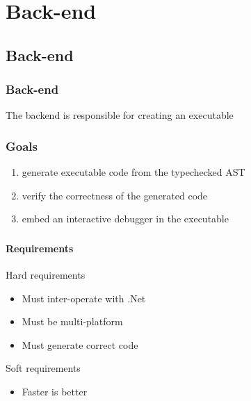 \section{Back-end}

\subsection{Back-end}
\begin{frame}
    \frametitle{Back-end}
    The backend is responsible for creating an executable
\end{frame}

\begin{frame}
    \frametitle{Goals}
    \begin{enumerate}
    \item generate executable code from the typechecked AST
    \item verify the correctness of the generated code 
    \item embed an interactive debugger in the executable
    \end{enumerate}
\end{frame}

\begin{frame}
    \frametitle{\subsecname}
    \framesubtitle{Requirements}
    Hard requirements
    \begin{itemize}
    \item Must inter-operate with .Net
    \item Must be multi-platform
    \item Must generate correct code
    \end{itemize}
    Soft requirements
    \begin{itemize}
    \item Faster is better
    \end{itemize}
\end{frame}

